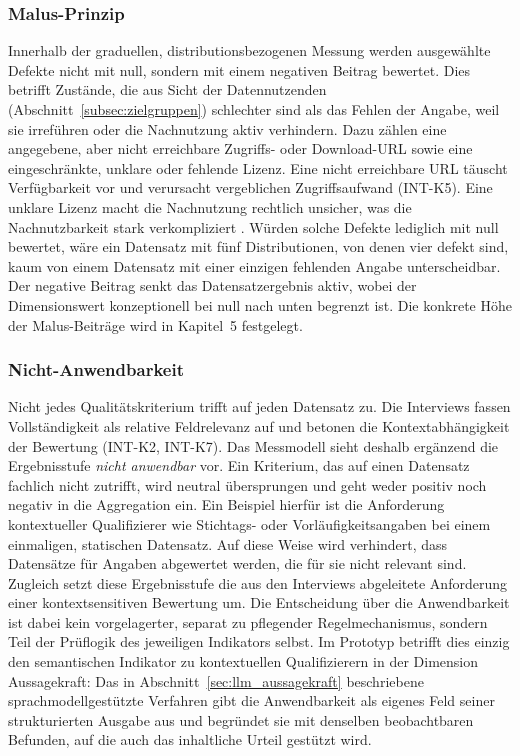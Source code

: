 \subsubsection{Malus-Prinzip}

Innerhalb der graduellen, distributionsbezogenen Messung werden ausgewählte Defekte nicht mit null, sondern mit einem negativen Beitrag bewertet. Dies betrifft Zustände, die aus Sicht der Datennutzenden (Abschnitt~\ref{subsec:zielgruppen}) schlechter sind als das Fehlen der Angabe, weil sie irreführen oder die Nachnutzung aktiv verhindern. Dazu zählen eine angegebene, aber nicht erreichbare Zugriffs- oder Download-URL sowie eine eingeschränkte, unklare oder fehlende Lizenz. Eine nicht erreichbare URL täuscht Verfügbarkeit vor und verursacht vergeblichen Zugriffsaufwand (INT-K5). Eine unklare Lizenz macht die Nachnutzung rechtlich unsicher, was die Nachnutzbarkeit stark verkompliziert \cite{Neumaier2016MetadataQuality}. Würden solche Defekte lediglich mit null bewertet, wäre ein Datensatz mit fünf Distributionen, von denen vier defekt sind, kaum von einem Datensatz mit einer einzigen fehlenden Angabe unterscheidbar. Der negative Beitrag senkt das Datensatzergebnis aktiv, wobei der Dimensionswert konzeptionell bei null nach unten begrenzt ist. Die konkrete Höhe der Malus-Beiträge wird in Kapitel~5 festgelegt.

\subsubsection{Nicht-Anwendbarkeit}

Nicht jedes Qualitätskriterium trifft auf jeden Datensatz zu. Die Interviews fassen Vollständigkeit als relative Feldrelevanz auf und betonen die Kontextabhängigkeit der Bewertung (INT-K2, INT-K7). Das Messmodell sieht deshalb ergänzend die Ergebnisstufe \textit{nicht anwendbar} vor. Ein Kriterium, das auf einen Datensatz fachlich nicht zutrifft, wird neutral übersprungen und geht weder positiv noch negativ in die Aggregation ein. Ein Beispiel hierfür ist die Anforderung kontextueller Qualifizierer wie Stichtags- oder Vorläufigkeitsangaben bei einem einmaligen, statischen Datensatz. Auf diese Weise wird verhindert, dass Datensätze für Angaben abgewertet werden, die für sie nicht relevant sind. Zugleich setzt diese Ergebnisstufe die aus den Interviews abgeleitete Anforderung einer kontextsensitiven Bewertung um. Die Entscheidung über die Anwendbarkeit ist dabei kein vorgelagerter, separat zu pflegender Regelmechanismus, sondern Teil der Prüflogik des jeweiligen Indikators selbst. Im Prototyp betrifft dies einzig den semantischen Indikator zu kontextuellen Qualifizierern in der Dimension Aussagekraft: Das in Abschnitt~\ref{sec:llm_aussagekraft} beschriebene sprachmodellgestützte Verfahren gibt die Anwendbarkeit als eigenes Feld seiner strukturierten Ausgabe aus und begründet sie mit denselben beobachtbaren Befunden, auf die auch das inhaltliche Urteil gestützt wird.

